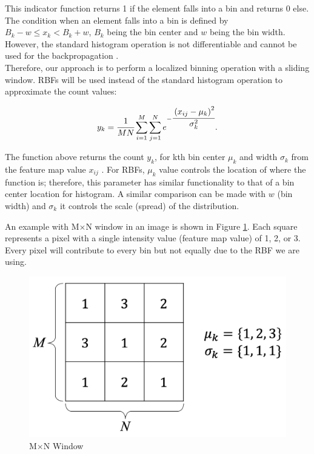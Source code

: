 \documentclass[10pt,twocolumn,letterpaper]{article}
\begin{document}
This indicator function returns 1 if the  element falls into a bin and returns 0 else. The condition when an element falls into a bin is defined by $B_k - w \leq x_k < B_k + w$, $B_k$ being the bin center and $w$ being the bin width. However, the standard histogram operation is not differentiable and cannot be used for the backpropagation \cite{Basu2018deeptexture}\cite{Wang2018learnable}.\\

Therefore, our approach is to perform a localized binning operation with a sliding window. RBFs will be used instead of the standard histogram operation to approximate the count values:

\begin{equation}
\label{eqn:rbf}
y_k =
\cfrac{1}{MN}\sum_{i=1}^{M}\sum_{j=1}^{N}e^{-\cfrac{\left(x_{ij}-\mu_k\right)^2}{\sigma_k^2}}.
\end{equation}

The function above returns the count $y_k$, for kth bin center $\mu_k$ and width $\sigma_k$ from the feature map value $x_{ij}$ . For RBFs, $\mu_k$ value controls the location of where the function is; therefore, this parameter has similar functionality to that of a bin center location for histogram. A similar comparison can be made with $w$ (bin width) and $\sigma_k$ it controls the scale (spread) of the distribution.

An example with M$\times$N window in an image is shown in Figure \ref{fig:2_1_1}. Each square represents a pixel with a single intensity value (feature map value) of 1, 2, or 3. Every pixel will contribute to every bin but not equally due to the RBF we are using. 


\begin{figure}[]
	\includegraphics[width=1.0\linewidth]{2_1_1.png}
	\caption{M$\times$N Window}
	\label{fig:2_1_1}
\end{figure}
\end{document}
